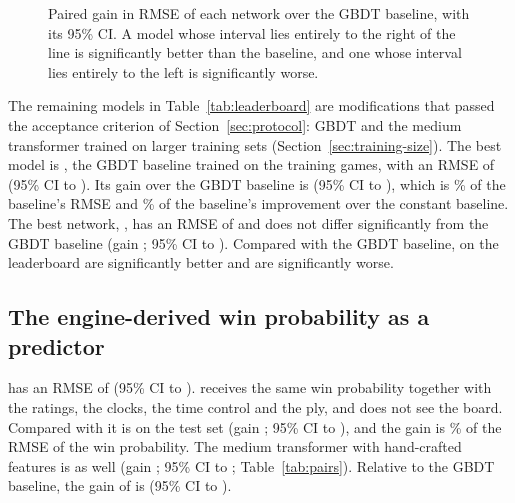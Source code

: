 \documentclass[11pt]{article}
\begin{document}
\begin{figure}[htbp]\centering
{}
\caption{Paired gain in RMSE of each network over the GBDT baseline, with its
95\% CI. A model whose interval lies entirely to the right of the line is
significantly better than the baseline, and one whose interval lies entirely
to the left is significantly worse.}
\label{fig:gains}
\end{figure}

The remaining models in Table~\ref{tab:leaderboard} are modifications that
passed the acceptance criterion of Section~\ref{sec:protocol}\ifmore: GBDT
and the medium transformer trained on larger training sets
(Section~\ref{sec:training-size})\fi. The best model is , the
GBDT baseline trained on  the training games, with an
RMSE of  (95\% CI  to ).
Its gain over the GBDT baseline is  (95\% CI 
to ), which is \% of the baseline's
RMSE and \% of the baseline's improvement over the
constant baseline. The best network, , has an RMSE of
 and does not differ significantly from the GBDT baseline
(gain ; 95\% CI  to
). Compared with the GBDT baseline,
 on the leaderboard are significantly better and
 are significantly worse.

\subsection{The engine-derived win probability as a predictor}
\label{sec:engine-baseline}

 has an RMSE of  (95\% CI
 to ).
\ifpairs
{} receives the same win probability together with the
ratings, the clocks, the time control and the ply, and does not see the
board. Compared with  it is
 on the test set (gain
; 95\% CI
 to
), and the gain is
\% of the RMSE of the win
probability. The medium transformer with hand-crafted features is
 as well (gain
; 95\% CI
 to
;
Table~\ref{tab:pairs}).
\fi
Relative to the GBDT baseline, the gain of  is
 (95\% CI  to
).
\end{document}
